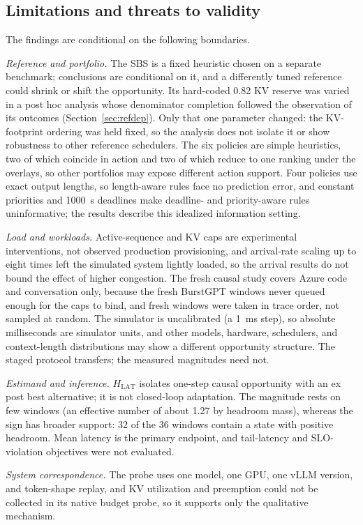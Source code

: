 \documentclass[preprint,12pt]{elsarticle}
\begin{document}
\subsection{Limitations and threats to validity}
The findings are conditional on the following boundaries.

\emph{Reference and portfolio.} The SBS is a fixed heuristic chosen on a separate
benchmark; conclusions are conditional on it, and a differently tuned reference
could shrink or shift the opportunity. Its hard-coded 0.82 KV reserve was varied
in a post hoc analysis whose denominator completion followed the observation of
its outcomes (Section~\ref{sec:refdep}). Only that one parameter changed: the
KV-footprint ordering was held fixed, so the analysis does not isolate it or show
robustness to other reference schedulers. The six policies are simple heuristics,
two of which coincide in action and two of which reduce to one ranking under the
overlays, so other portfolios may expose different action support. Four policies
use exact output lengths, so length-aware rules face no prediction error, and
constant priorities and 1000~s deadlines make deadline- and priority-aware rules
uninformative; the results describe this idealized information setting.

\emph{Load and workloads.} Active-sequence and KV caps are experimental
interventions, not observed production provisioning, and arrival-rate scaling up
to eight times left the simulated system lightly loaded, so the arrival results
do not bound the effect of higher congestion. The fresh causal study covers
Azure code and conversation only, because the fresh BurstGPT windows never
queued enough for the caps to bind, and fresh windows were taken in trace order,
not sampled at random. The simulator is uncalibrated (a 1~ms step), so absolute
milliseconds are simulator units, and other models, hardware, schedulers, and
context-length distributions may show a different opportunity structure. The
staged protocol transfers; the measured magnitudes need not.

\emph{Estimand and inference.} $H_{\mathrm{LAT}}$ isolates one-step causal
opportunity with an ex post best alternative; it is not closed-loop adaptation.
The magnitude rests on few windows (an effective number of about 1.27 by
headroom mass), whereas the sign has broader support: 32 of the 36 windows
contain a state with positive headroom. Mean latency is the primary endpoint,
and tail-latency and SLO-violation objectives were not evaluated.

\emph{System correspondence.} The probe uses one model, one GPU, one vLLM
version, and token-shape replay, and KV utilization and preemption could not be
collected in its native budget probe, so it supports only the qualitative
mechanism.
\end{document}
